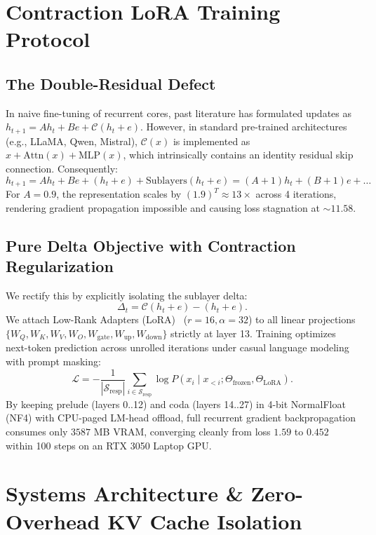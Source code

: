 \documentclass[11pt,a4paper]{article}
\theoremstyle{plain}
\theoremstyle{definition}
\theoremstyle{remark}
\begin{document}
\section{Contraction LoRA Training Protocol}

\subsection{The Double-Residual Defect}
In naive fine-tuning of recurrent cores, past literature has formulated updates as $h_{t+1} = A h_t + B e + \mathcal{C}(h_t + e)$. However, in standard pre-trained architectures (e.g., LLaMA, Qwen, Mistral), $\mathcal{C}(x)$ is implemented as $x + \text{Attn}(x) + \text{MLP}(x)$, which intrinsically contains an identity residual skip connection. Consequently:
\begin{equation}
    h_{t+1} = A h_t + B e + (h_t + e) + \text{Sublayers}(h_t + e) = (A + 1) h_t + (B + 1) e + \dots
\end{equation}
For $A=0.9$, the representation scales by $(1.9)^T \approx 13\times$ across 4 iterations, rendering gradient propagation impossible and causing loss stagnation at $\sim 11.58$.

\subsection{Pure Delta Objective with Contraction Regularization}
We rectify this by explicitly isolating the sublayer delta:
\begin{equation}
    \Delta_t = \mathcal{C}(h_t + e) - (h_t + e).
\end{equation}
We attach Low-Rank Adapters (LoRA)~\cite{hu2021lora} ($r=16, \alpha=32$) to all linear projections $\{W_Q, W_K, W_V, W_O, W_{\text{gate}}, W_{\text{up}}, W_{\text{down}}\}$ strictly at layer 13. Training optimizes next-token prediction across unrolled iterations under casual language modeling with prompt masking:
\begin{equation}
    \mathcal{L} = -\frac{1}{|\mathcal{S}_{\text{resp}}|} \sum_{i \in \mathcal{S}_{\text{resp}}} \log P(x_i \mid x_{<i}; \Theta_{\text{frozen}}, \Theta_{\text{LoRA}}).
\end{equation}
By keeping prelude (layers 0..12) and coda (layers 14..27) in 4-bit NormalFloat (NF4) with CPU-paged LM-head offload, full recurrent gradient backpropagation consumes only $3587$ MB VRAM, converging cleanly from loss $1.59$ to $0.452$ within 100 steps on an RTX 3050 Laptop GPU.

\section{Systems Architecture \& Zero-Overhead KV Cache Isolation}
\end{document}

